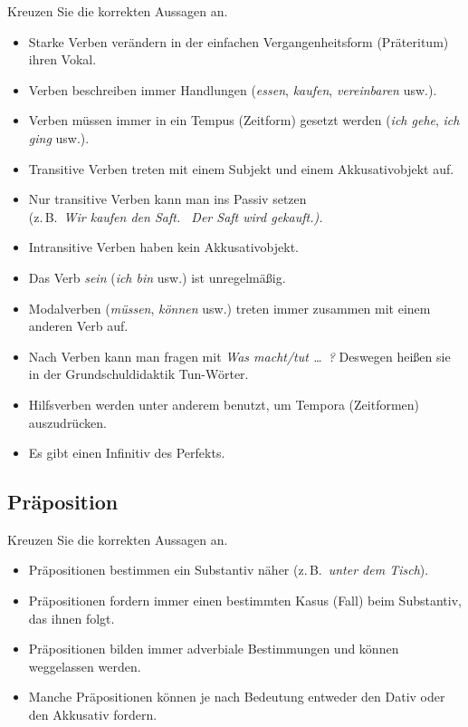 \documentclass[12pt,a4paper,twoside]{article}
\begin{document}
Kreuzen Sie die korrekten Aussagen an.

\begin{itemize}[label=\Square]\Lf
  \item[\Solcross] Starke Verben verändern in der einfachen Vergangenheitsform (Präteritum) ihren Vokal.
  \item Verben beschreiben immer Handlungen (\textit{essen}, \textit{kaufen}, \textit{vereinbaren} usw.).
  \item Verben müssen immer in ein Tempus (Zeitform) gesetzt werden (\textit{ich gehe}, \textit{ich ging} usw.).
  \item[\Solcross] Transitive Verben treten mit einem Subjekt und einem Akkusativobjekt auf.
  \item Nur transitive Verben kann man ins Passiv setzen\\
    (z.\,B.\ \textit{Wir kaufen den Saft. \ Der Saft wird gekauft.).}
  \item[\Solcross] Intransitive Verben haben kein Akkusativobjekt.
  \item[\Solcross] Das Verb \textit{sein} (\textit{ich bin} usw.) ist unregelmäßig.
  \item[\Solcross] Modalverben (\textit{müssen}, \textit{können} usw.) treten immer zusammen mit einem anderen Verb auf.
  \item Nach Verben kann man fragen mit \textit{Was macht\slash tut \ldots\ ?}
    Deswegen heißen sie in der Grundschuldidaktik Tun-Wörter.
  \item[\Solcross] Hilfsverben werden unter anderem benutzt, um Tempora (Zeitformen) auszudrücken.
  \item[\Solcross] Es gibt einen Infinitiv des Perfekts.
\end{itemize}


\subsection{\morphologieaufgabe Präposition}

Kreuzen Sie die korrekten Aussagen an.

\begin{itemize}[label=\Square]\Lf
  \item Präpositionen bestimmen ein Substantiv näher (z.\,B.\ \textit{unter dem Tisch}).
  \item[\Solcross] Präpositionen fordern immer einen bestimmten Kasus (Fall) beim Substantiv, das ihnen folgt.
  \item Präpositionen bilden immer adverbiale Bestimmungen und können weggelassen werden.
  \item[\Solcross] Manche Präpositionen können je nach Bedeutung entweder den Dativ oder den Akkusativ fordern.
\end{itemize}
\end{document}
